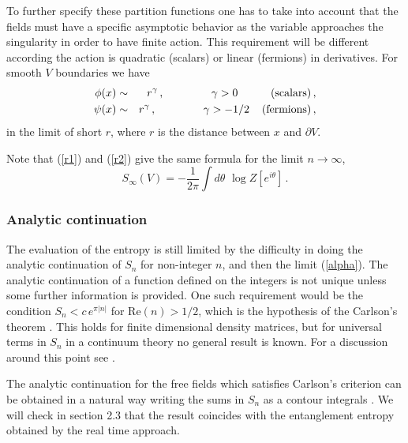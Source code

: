 \documentclass[a4paper]{article}
\begin{document}
To further specify these partition functions one has to take into account that the fields must have a specific asymptotic behavior as the variable approaches the singularity in order to have finite action. This requirement will be different according the action is quadratic (scalars) or linear (fermions) in derivatives. For smooth $V$ boundaries we have 
\begin{eqnarray}
\phi(x) &\sim& r^\gamma\,,\hspace{1.5cm} \gamma > 0 \hspace{1.05cm}\textrm{(scalars)}\,,\label{chia}\\
\psi(x) &\sim& r^\gamma\,, \hspace{1.5cm}  \gamma > -1/2  \hspace{.4cm}\textrm{(fermions)} \,,
\label{choa}\end{eqnarray}
in the limit of short $r$, where $r$ is the distance between $x$ and $\partial V$. 

Note that (\ref{r1}) and (\ref{r2}) give the same formula for the limit $n\rightarrow \infty$,
\begin{equation}
S_\infty(V)=-\frac{1}{2 \pi} \int d\theta\,\, \log Z[e^{i \theta}]\,.
\end{equation}

\subsubsection{Analytic continuation}
The evaluation of the entropy is still limited by the difficulty in doing the analytic continuation of  $S_n$ for non-integer $n$, and then the limit (\ref{alpha}). The analytic continuation of a function defined on the integers is not unique unless some further information is provided. One such requirement would be the condition $S_n<c\, e^{\pi |n| }$ for Re$(n)>1/2$, which is the hypothesis of the Carlson's theorem \cite{ccd,carl}. This holds for finite dimensional density matrices, but for universal terms in $S_n$ in a continuum theory no general result is known. For a discussion around this point see \cite{ccd,d1}. 

The analytic continuation for the free fields which satisfies Carlson's criterion can be obtained  in a natural way writing the sums in $S_n$ as a contour integrals \cite{chana}. We will check in section 2.3 that the result coincides with the entanglement entropy obtained by the real time approach. 
\end{document}
